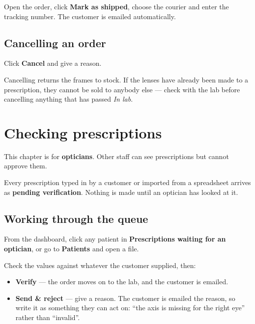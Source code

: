 \documentclass[11pt,a4paper]{report}
\newcommand{\btn}[1]{\textbf{#1}}
\newcommand{\menu}[1]{\textsf{\textbf{#1}}}
\begin{document}
Open the order, click \btn{Mark as shipped}, choose the courier and enter the
tracking number. The customer is emailed automatically.

\section{Cancelling an order}

Click \btn{Cancel} and give a reason.

\begin{warnbox}
Cancelling returns the frames to stock. If the lenses have already been
made to a prescription, they cannot be sold to anybody else --- check
with the lab before cancelling anything that has passed \emph{In lab}.
\end{warnbox}

\chapter{Checking prescriptions}

\begin{notebox}
This chapter is for \textbf{opticians}. Other staff can see
prescriptions but cannot approve them.
\end{notebox}

Every prescription typed in by a customer or imported from a spreadsheet
arrives as \textbf{pending verification}. Nothing is made until an
optician has looked at it.

\section{Working through the queue}

From the dashboard, click any patient in
\menu{Prescriptions waiting for an optician}, or go to \menu{Patients}
and open a file.

Check the values against whatever the customer supplied, then:

\begin{itemize}
  \item \btn{Verify} --- the order moves on to the lab, and the
        customer is emailed.
  \item \btn{Send \& reject} --- give a reason. The customer is emailed the
        reason, so write it as something they can act on: ``the axis is
        missing for the right eye'' rather than ``invalid''.
\end{itemize}
\end{document}
